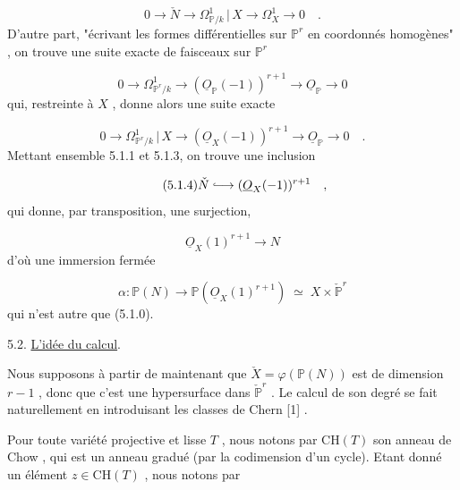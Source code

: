 \begin{equation}\tag{5.1.1}
0 \longrightarrow \check{N} \longrightarrow \Omega^1_{\mathbb{P}/k} \,|\, X \longrightarrow \Omega^1_X \longrightarrow 0 \quad .
\end{equation}
D'autre part, "écrivant les formes différentielles sur $\mathbb{P}^r$ en coordonnés homogènes" , on trouve une suite exacte de faisceaux sur $\mathbb{P}^r$

\begin{equation}\tag{5.1.2}
0 \longrightarrow \Omega^1_{\mathbb{P}^r/k} \longrightarrow (\underline{O}_{\mathbb{P}}(-1))^{r+1} \longrightarrow \underline{O}_{\mathbb{P}} \longrightarrow 0
\end{equation}
qui, restreinte à $X$ , donne alors une suite exacte

\begin{equation}\tag{5.1.3}
0 \longrightarrow \Omega^1_{\mathbb{P}^r/k} \,|\, X \longrightarrow (\underline{O}_X(-1))^{r+1} \longrightarrow \underline{O}_{\mathbb{P}} \longrightarrow 0 \quad .
\end{equation}
Mettant ensemble 5.1.1 et 5.1.3, on trouve une inclusion

\begin{equation}\tag{5.1.4}
\check{N} \lhook\joinrel\longrightarrow (\underline{O}_X(-1))^{r+1} \quad ,
\end{equation}
qui donne, par transposition, une surjection,

\begin{equation}\tag{5.1.5}
\underline{O}_X(1)^{r+1} \longrightarrow N
\end{equation}
d'où une immersion fermée

\begin{equation}\tag{5.1.6}
\alpha : \mathbb{P}(N) \longrightarrow \mathbb{P}(\underline{O}_X(1)^{r+1}) \;\simeq\; X \times \check{\mathbb{P}}^r
\end{equation}
qui n'est autre que (5.1.0).




5.2.  \underline{L'idée du calcul}.

Nous supposons à partir de maintenant que $\check{X} = \varphi(\mathbb{P}(N))$ est de dimension $r-1$ , donc que c'est une hypersurface dans $\check{\mathbb{P}}^r$ . Le calcul de son degré se fait naturellement en introduisant les classes de Chern [1] .

Pour toute variété projective et lisse $T$ , nous notons par $\mathrm{CH}(T)$ son anneau de Chow , qui est un anneau gradué (par la codimension d'un cycle). Etant donné un élément $z \in \mathrm{CH}(T)$ , nous notons par

